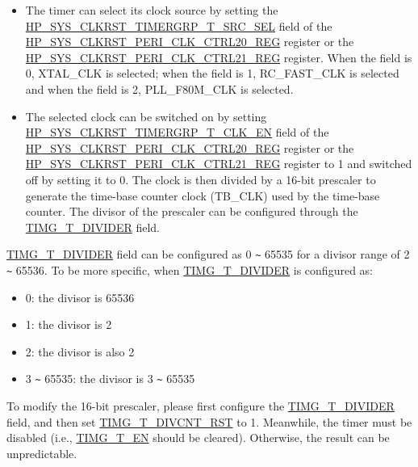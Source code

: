 \documentclass[main\_\_EN.tex]{subfiles}
\begin{document}
\begin{itemize}
    \item The timer can select its clock source by setting the \hyperref[fielddesc:HPSYSCLKRSTTIMERGRP0T0SRCSEL]{HP\_SYS\_CLKRST\_TIMERGRP\_T\_SRC\_SEL} field of the \hyperref[regdesc:HPSYSCLKRSTPERICLKCTRL20REG]{HP\_SYS\_CLKRST\_PERI\_CLK\_CTRL20\_REG} register or the \hyperref[regdesc:HPSYSCLKRSTPERICLKCTRL21REG]{HP\_SYS\_CLKRST\_PERI\_CLK\_CTRL21\_REG} register. When the field is 0, XTAL\_CLK is selected; when the field is 1, RC\_FAST\_CLK is selected and when the field is 2, PLL\_F80M\_CLK is selected.

    \item The selected clock can be switched on by setting \hyperref[fielddesc:HPSYSCLKRSTTIMERGRP0T0CLKEN]{HP\_SYS\_CLKRST\_TIMERGRP\_T\_CLK\_EN} field of the \hyperref[regdesc:HPSYSCLKRSTPERICLKCTRL20REG]{HP\_SYS\_CLKRST\_PERI\_CLK\_CTRL20\_REG} register or the \hyperref[regdesc:HPSYSCLKRSTPERICLKCTRL21REG]{HP\_SYS\_CLKRST\_PERI\_CLK\_CTRL21\_REG} register to 1 and switched off by setting it to 0. The clock is then divided by a 16-bit prescaler to generate the time-base counter clock (TB\_CLK) used by the time-base counter. The divisor of the prescaler can be configured through the \hyperref[fielddesc:TIMGTXDIVIDER]{TIMG\_T\_DIVIDER} field.

\end{itemize}

\hyperref[fielddesc:TIMGTXDIVIDER]{TIMG\_T\_DIVIDER} field can be configured as 0 \verb+~+ 65535 for a divisor range of 2 \verb+~+ 65536. To be more specific, when \hyperref[fielddesc:TIMGTXDIVIDER]{TIMG\_T\_DIVIDER} is configured as:
\begin{itemize}
    \item 0: the divisor is 65536
    \item 1: the divisor is 2
    \item 2: the divisor is also 2
    \item 3 \verb+~+ 65535: the divisor is 3 \verb+~+ 65535
\end{itemize}


To modify the 16-bit prescaler, please first configure the \hyperref[fielddesc:TIMGTXDIVIDER]{TIMG\_T\_DIVIDER} field, and then set \hyperref[fielddesc:TIMGTXDIVCNTRST]{TIMG\_T\_DIVCNT\_RST} to 1. Meanwhile, the timer must be disabled (i.e., \hyperref[fielddesc:TIMGTXEN]{TIMG\_T\_EN} should be cleared). Otherwise, the result can be unpredictable.
\end{document}
